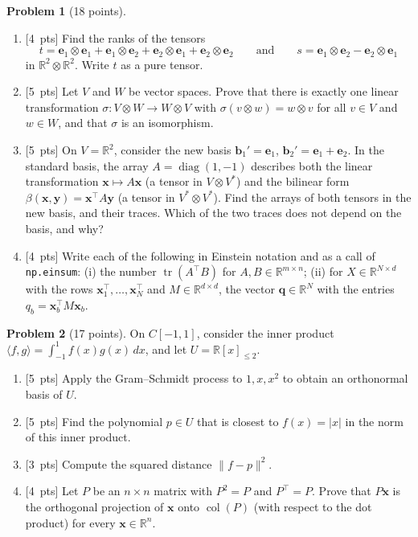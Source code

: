 \documentclass[11pt]{article}
\theoremstyle{definition}
\newtheorem{problem}{Problem}
\newcommand{\norm}[1]{\lVert #1 \rVert}
\newcommand{\ip}[2]{\langle #1, #2 \rangle}
\newcommand{\pts}[1]{\textup{[#1~pts]}}
\DeclareMathOperator{\col}{col}
\DeclareMathOperator{\tr}{tr}
\DeclareMathOperator{\diag}{diag}
\begin{document}
\begin{problem}[18 points]\label{pr:mid-tensors}
    \begin{enumerate}[label=(\alph*)]
        \item \pts{4} Find the ranks of the tensors
        \[t = \mathbf{e}_1 \otimes \mathbf{e}_1 + \mathbf{e}_1 \otimes \mathbf{e}_2 + \mathbf{e}_2 \otimes \mathbf{e}_1 + \mathbf{e}_2 \otimes \mathbf{e}_2 \qquad \text{and} \qquad s = \mathbf{e}_1 \otimes \mathbf{e}_2 - \mathbf{e}_2 \otimes \mathbf{e}_1\]
        in $\mathbb{R}^2 \otimes \mathbb{R}^2$. Write $t$ as a pure tensor.
        \item \pts{5} Let $V$ and $W$ be vector spaces. Prove that there is exactly one linear transformation $\sigma: V \otimes W \to W \otimes V$ with $\sigma(v \otimes w) = w \otimes v$ for all $v \in V$ and $w \in W$, and that $\sigma$ is an isomorphism.
        \item \pts{5} On $V = \mathbb{R}^2$, consider the new basis $\mathbf{b}_1' = \mathbf{e}_1$, $\mathbf{b}_2' = \mathbf{e}_1 + \mathbf{e}_2$. In the standard basis, the array $A = \diag(1, -1)$ describes both the linear transformation $\mathbf{x} \mapsto A\mathbf{x}$ (a tensor in $V \otimes V^*$) and the bilinear form $\beta(\mathbf{x}, \mathbf{y}) = \mathbf{x}^\top A\mathbf{y}$ (a tensor in $V^* \otimes V^*$). Find the arrays of both tensors in the new basis, and their traces. Which of the two traces does not depend on the basis, and why?
        \item \pts{4} Write each of the following in Einstein notation and as a call of \texttt{np.einsum}: (i) the number $\tr(A^\top B)$ for $A, B \in \mathbb{R}^{m \times n}$; (ii) for $X \in \mathbb{R}^{N \times d}$ with the rows $\mathbf{x}_1^\top, \ldots, \mathbf{x}_N^\top$ and $M \in \mathbb{R}^{d \times d}$, the vector $\mathbf{q} \in \mathbb{R}^N$ with the entries $q_b = \mathbf{x}_b^\top M\mathbf{x}_b$.
    \end{enumerate}
\end{problem}

\begin{problem}[17 points]\label{pr:mid-projection}
    On $C[-1, 1]$, consider the inner product $\ip{f}{g} = \int_{-1}^1 f(x)g(x)\, dx$, and let $U = \mathbb{R}[x]_{\leq 2}$.
    \begin{enumerate}[label=(\alph*)]
        \item \pts{5} Apply the Gram--Schmidt process to $1, x, x^2$ to obtain an orthonormal basis of $U$.
        \item \pts{5} Find the polynomial $p \in U$ that is closest to $f(x) = |x|$ in the norm of this inner product.
        \item \pts{3} Compute the squared distance $\norm{f - p}^2$.
        \item \pts{4} Let $P$ be an $n \times n$ matrix with $P^2 = P$ and $P^\top = P$. Prove that $P\mathbf{x}$ is the orthogonal projection of $\mathbf{x}$ onto $\col(P)$ (with respect to the dot product) for every $\mathbf{x} \in \mathbb{R}^n$.
    \end{enumerate}
\end{problem}
\end{document}

